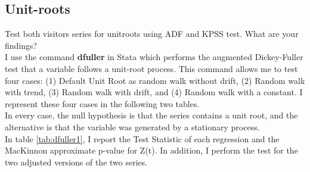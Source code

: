 \documentclass[11pt]{article}
\begin{document}
\subsection{Unit-roots}
Test both visitors series for unitroots using ADF and KPSS test. What are your findings?\\

I use the command \textbf{dfuller} in Stata which performs the augmented Dickey-Fuller test that a variable follows a unit-root process. This command allows me to test four cases: (1) Default Unit Root as random walk without drift, (2) Random walk with trend, (3) Random walk with drift, and (4) Random walk with a constant. I represent these four cases in the following two tables. \\
In every case, the null hypothesis is that the series contains a unit root, and the alternative is that the variable was generated by a stationary process. \\
In table \ref{tab:dfuller1}, I report the Test Statistic of each regression and the MacKinnon approximate p-value for Z(t). In addition, I perform the test for the two adjusted versions of the two series.

\end{document}
